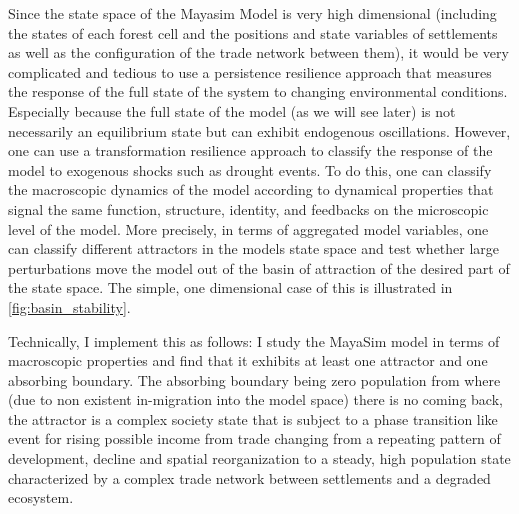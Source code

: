 
Since the state space of the Mayasim Model is very high dimensional (including the states of each forest cell and the positions and state variables of settlements as well as the configuration of the trade network between them), it would be very complicated and tedious to use a persistence resilience approach that measures the response of the full state of the system to changing environmental conditions. Especially because the full state of the model (as we will see later) is not necessarily an equilibrium state but can exhibit endogenous oscillations.
However, one can use a transformation resilience approach to classify the response of the model to exogenous shocks such as drought events.
To do this, one can classify the macroscopic dynamics of the model according to dynamical properties that signal the same function, structure, identity, and feedbacks on the microscopic level of the model. More precisely, in terms of aggregated model variables, one can classify different attractors in the models state space and test whether large perturbations move the model out of the basin of attraction of the desired part of the state space. The simple, one dimensional case of this is illustrated in \cref{fig:basin_stability}.

Technically, I implement this as follows:
I study the MayaSim model in terms of macroscopic properties and find that it exhibits at least one attractor and one absorbing boundary. The absorbing boundary being zero population from where (due to non existent in-migration into the model space) there is no coming back, the attractor is a complex society state that is subject to a phase transition like event for rising possible income from trade changing from a repeating pattern of development, decline and spatial reorganization to a steady, high population state characterized by a complex trade network between settlements and a degraded ecosystem.

